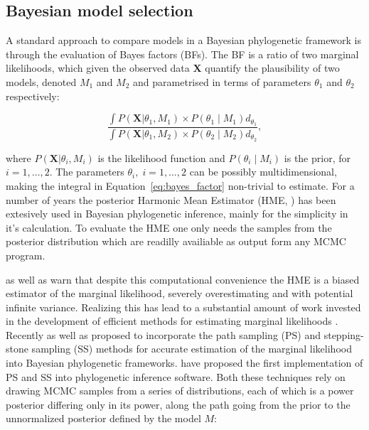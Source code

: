\subsection{Bayesian model selection\label{sub:model_selection}}

A standard approach to compare models in a Bayesian phylogenetic framework is through the evaluation of Bayes factors (BFs).   
The BF is a ratio of two marginal likelihoods, which given the observed data $\mathbf{X}$ quantify the plausibility of two models, denoted $M_{1}$ and $M_{2}$ and parametrised in terms of parameters $\theta_{1}$ and $\theta_{2}$ respectively:

% 
\begin{equation}  
\frac{\int P\left(\mathbf{X}|\theta_{1},M_{1}\right)\times P\left(\theta_{1} \mid M_{1}  \right)d_{\theta_{1}}}{\int P\left(\mathbf{X}|\theta_{1},M_{2}\right)\times P\left(\theta_{2} \mid M_{2} \right)d_{\theta_{2}}},
\label{eq:bayes_factor}
\end{equation}  
% 

\noindent
where $P\left(\mathbf{X}|\theta_{i},M_{i}\right)$ is the likelihood function and $P\left(\theta_{i} \mid M_{i} \right)$ is the prior, for $i=1, \ldots, 2$.
The parameters $\theta_{i},\; i=1, \ldots, 2$ can be possibly multidimensional, making the integral in Equation~\ref{eq:bayes_factor} non-trivial to estimate.
For a number of years the posterior Harmonic Mean Estimator (HME, \cite{Newton1994}) has been extesively used in Bayesian phylogenetic inference, mainly for the simplicity in it's calculation. 
To evaluate the HME one only needs the samples from the posterior distribution which are readilly availiable as output form any MCMC program.

\cite{Meng1996} as well as \cite{Xie2011} warn that despite this computational convenience the HME is a biased estimator of the marginal likelihood, severely overestimating and with potential infinite variance.
Realizing this has lead to a substantial amount of work invested in the development of efficient methods for estimating marginal likelihoods \citep{Suchard2001,Lemey2009,Li2012}.
Recently \cite{Lartillot2006} as well as \cite{Xie2011} proposed to incorporate the path sampling (PS) and stepping-stone sampling (SS) methods for accurate estimation of the marginal likelihood into Bayesian phylogenetic frameworks.
\cite{Baele2012} have proposed the first implementation of PS and SS into phylogenetic inference software.
Both these techniques rely on drawing MCMC samples from a series of distributions, each of which is a power posterior differing only in its power, along the path going from the prior to the unnormalized posterior defined by the model $M$:  

